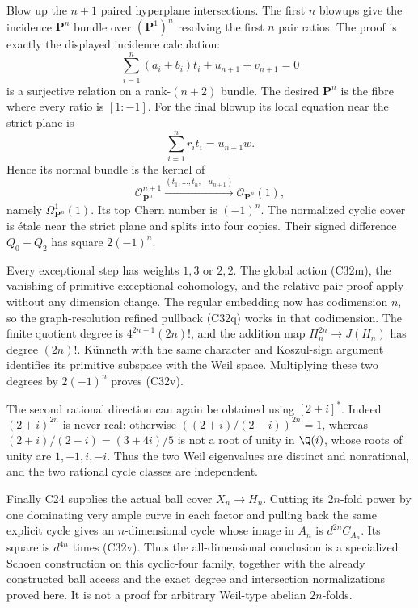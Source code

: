 Blow up the $n+1$ paired hyperplane
intersections.  The first $n$ blowups give
the incidence $\mathbf P^n$ bundle over
$(\mathbf P^1)^n$ resolving the first
$n$ pair ratios.  The proof is exactly
the displayed incidence calculation:
\[
       \sum_{i=1}^{n}(a_i+b_i)t_i+u_{n+1}+v_{n+1}=0
\]
is a surjective relation on a rank-$(n+2)$
bundle.  The desired $\mathbf P^n$ is
the fibre where every ratio is $[1:-1]$.
For the final blowup its local equation
near the strict plane is
\[
                  \sum_{i=1}^{n}r_it_i=u_{n+1}w.
\]
Hence its normal bundle is the kernel of
\[
       \mathcal O_{\mathbf P^n}^{n+1}
        \xrightarrow{(t_1,\ldots,t_n,-u_{n+1})}
                          \mathcal O_{\mathbf P^n}(1),
\]
namely $\Omega^1_{\mathbf P^n}(1)$.  Its
top Chern number is $(-1)^n$.
The normalized cyclic cover is \'etale near
the strict plane and splits into four
copies.  Their signed difference $Q_0-Q_2$
has square $2(-1)^n$.

Every exceptional step has weights $1,3$
or $2,2$.  The global action (C32m), the
vanishing of primitive exceptional
cohomology, and the relative-pair proof
apply without any dimension change.
The regular embedding now has codimension
$n$, so the graph-resolution refined
pullback (C32q) works in that codimension.
The finite quotient degree is
$4^{2n-1}(2n)!$, and the addition map
$H_n^{2n}\to J(H_n)$ has degree $(2n)!$.
K\"unneth with the same character and
Koszul-sign argument identifies its
primitive subspace with the Weil space.
Multiplying these two degrees by
$2(-1)^n$ proves (C32v).

The second rational direction can again
be obtained using $[2+i]^*$.  Indeed
$(2+i)^{2n}$ is never real: otherwise
$((2+i)/(2-i))^{2n}=1$, whereas
$(2+i)/(2-i)=(3+4i)/5$ is not a root
of unity in $\Q(i)$, whose roots of
unity are $1,-1,i,-i$.  Thus the two
Weil eigenvalues are distinct and
nonrational, and the two rational
cycle classes are independent.

Finally C24 supplies the actual ball
cover $X_n\to H_n$.  Cutting its
$2n$-fold power by one dominating
very ample curve in each factor and
pulling back the same explicit cycle
gives an $n$-dimensional cycle whose
image in $A_n$ is $d^{2n}C_{A_n}$.
Its square is $d^{4n}$ times (C32v).
Thus the all-dimensional conclusion
is a specialized Schoen construction
on this cyclic-four family, together
with the already constructed ball
access and the exact degree and
intersection normalizations proved
here.  It is not a proof for arbitrary
Weil-type abelian $2n$-folds.


